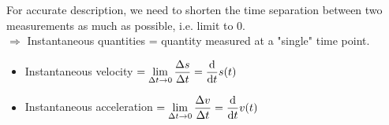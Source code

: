 \documentclass[class=article, crop=false, 12pt]{standalone}
\begin{document}
For accurate description, we need to shorten the time separation between two measurements as much as possible, i.e. limit to $0$.\\
$\Rightarrow$ Instantaneous quantities = quantity measured at a "single" time point.

\begin{itemize}
    \item Instantaneous velocity $= \displaystyle \lim_{\Delta t\to 0} \dfrac{\Delta s}{\Delta t} = \dvv{t}s(t)$
    \item Instantaneous acceleration $= \displaystyle \lim_{\Delta t \to 0} \dfrac{\Delta v}{\Delta t} = \dvv{t}v(t)$ 
\end{itemize}
\end{document}
